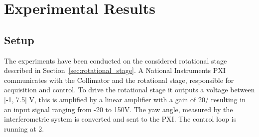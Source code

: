\chapter{Experimental Results}\label{cha:exp_result}
\section{Setup}\label{sec:setup}
The experiments have been conducted on the considered rotational stage described in Section~\ref{sec:rotational_stage}. A National Instruments PXI communicates with the Collimator and the rotational stage, responsible for acquisition and control. To drive the rotational stage it outputs a voltage between [-1, 7.5] V, this is amplified by a linear amplifier with a gain of \unit{20}{\volt/\volt} resulting in an input signal ranging from -20 to 150V. The yaw angle, measured by the interferometric system is converted and sent to the PXI. The control loop is running at \unit{2}{\kilo\hertz}.

